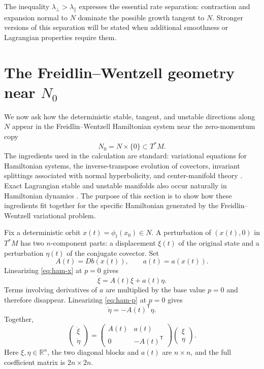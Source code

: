 \documentclass[11pt]{article}
\theoremstyle{definition}
\theoremstyle{remark}
\newcommand{\R}{\mathbb{R}}
\newcommand{\phit}{\phi_t}
\newcommand{\cT}{\mathsf{T}}
\begin{document}
The inequality $\lambda_{\perp}>\lambda_{\parallel}$ expresses the essential rate separation: contraction and expansion normal to $N$ dominate the possible growth tangent to $N$.  Stronger versions of this separation will be stated when additional smoothness or Lagrangian properties require them.

\section{The Freidlin--Wentzell geometry near \texorpdfstring{$N_0$}{N0}}
\label{sec:carrier}

We now ask how the deterministic stable, tangent, and unstable directions along $N$ appear in the Freidlin--Wentzell Hamiltonian system near the zero-momentum copy
\begin{equation}
N_0=N\times\{0\}\subset T^*M.
\end{equation}
The ingredients used in the calculation are standard: variational equations for Hamiltonian systems, the inverse-transpose evolution of covectors, invariant splittings associated with normal hyperbolicity, and center-manifold theory \cite{MarsdenRatiu1999,Fenichel1971,HirschPughShub1977,ChowLiuYi2000Smooth,ChowLiuYi2000Sets,Mielke1991}.  Exact Lagrangian stable and unstable manifolds also occur naturally in Hamiltonian dynamics \cite{RudnevWiggins1999}.  The purpose of this section is to show how these ingredients fit together for the specific Hamiltonian generated by the Freidlin--Wentzell variational problem.

Fix a deterministic orbit $x(t)=\phit(x_0)\in N$.  A perturbation of $(x(t),0)$ in $T^*M$ has two $n$-component parts: a displacement $\xi(t)$ of the original state and a perturbation $\eta(t)$ of the conjugate covector.  Set
\begin{equation}
A(t)=Db(x(t)),
\qquad
a(t)=a(x(t)).
\end{equation}
Linearizing \eqref{eq:ham-x} at $p=0$ gives
\begin{equation}
\dot\xi=A(t)\xi+a(t)\eta.
\label{eq:variational-x}
\end{equation}
Terms involving derivatives of $a$ are multiplied by the base value $p=0$ and therefore disappear.  Linearizing \eqref{eq:ham-p} at $p=0$ gives
\begin{equation}
\dot\eta=-A(t)^{\cT}\eta.
\label{eq:variational-p}
\end{equation}
Together,
\begin{equation}
\begin{pmatrix}\dot\xi\\ \dot\eta\end{pmatrix}
=
\begin{pmatrix}
A(t)&a(t)\\
0&-A(t)^{\cT}
\end{pmatrix}
\begin{pmatrix}\xi\\ \eta\end{pmatrix}.
\label{eq:variational-block}
\end{equation}
Here $\xi,\eta\in\R^n$, the two diagonal blocks and $a(t)$ are $n\times n$, and the full coefficient matrix is $2n\times2n$.
\end{document}

